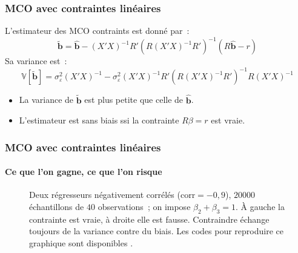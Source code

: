 \documentclass[10pt]{beamer}
\begin{document}
\begin{frame}
  \frametitle{MCO avec contraintes linéaires}

  \begin{theorem}\label{thm:constrained_ols}
    L'estimateur des MCO contraints est donné par~:
    \[
      \tilde{\mathbf b} = \hat{\mathbf b} - (X'X)^{-1}R'\left( R(X'X)^{-1}R' \right)^{-1}\left( R\hat{\mathbf b}-r \right)
    \]
    Sa variance est~:
    \[
      \mathbb V\left[ \tilde{\mathbf b} \right] = \sigma_{\varepsilon}^2(X'X)^{-1} - \sigma_{\varepsilon}^2(X'X)^{-1}R'\left( R(X'X)^{-1}R' \right)^{-1}R(X'X)^{-1}
    \]
  \end{theorem}

  \bigskip

  \begin{itemize}

  \item La variance de $\tilde{\mathbf b}$ est plus petite que celle de $\hat{\mathbf b}$.\newline

  \item L'estimateur est sans biais ssi la contrainte $R\beta = r$ est vraie.

  \end{itemize}

\end{frame}


\begin{frame}[c]
  \frametitle{MCO avec contraintes linéaires}
  \framesubtitle{Ce que l'on gagne, ce que l'on risque}

  \begin{figure}
    \centering
    \scalebox{.46}{}
    \caption{Deux régresseurs négativement corrélés ($\mathrm{corr}=-0{,}9$), $20000$ échantillons de $40$ observations~; on impose $\beta_2+\beta_3=1$. À gauche la contrainte est vraie, à droite elle est fausse. Contraindre échange toujours de la variance contre du biais. Les codes pour reproduire ce graphique sont disponibles .}
  \end{figure}

\end{frame}
\end{document}
